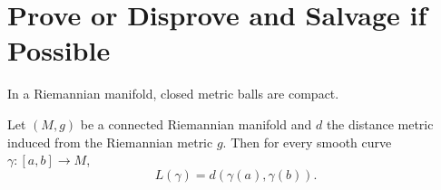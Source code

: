 \documentclass{homework}
\begin{document}
\section{Prove or Disprove and Salvage if Possible}

\begin{problem}
  In a Riemannian manifold, closed metric balls are compact.
\end{problem}

\begin{problem}
  Let $(M,g)$ be a connected Riemannian manifold and $d$ the distance metric induced from the Riemannian metric $g$.
  Then for every smooth curve $\gamma:[a,b]\to M$,
  \[
    L(\gamma)=d(\gamma(a),\gamma(b)).
  \]
\end{problem}
\end{document}

